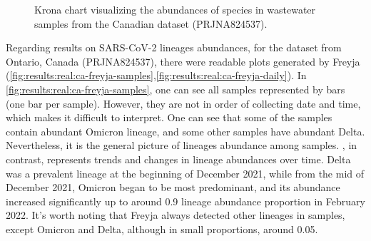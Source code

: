 \begin{figure}[ht!]
\begin{subfigure}[b]{0.3\textwidth}
        \label{fig:results:real:krona-ca-c}
        \end{subfigure}
        \caption{Krona chart visualizing the abundances of species in wastewater samples from the Canadian dataset (PRJNA824537).}
    \end{figure}
    
    Regarding results on SARS-CoV-2 lineages abundances, for the dataset from Ontario, Canada (PRJNA824537), there were readable plots generated by Freyja (\cref{fig:results:real:ca-freyja-samples},\ref{fig:results:real:ca-freyja-daily}). In \cref{fig:results:real:ca-freyja-samples}, one can see all samples represented by bars (one bar per sample). However, they are not in order of collecting date and time, which makes it difficult to interpret. One can see that some of the samples contain abundant Omicron lineage, and some other samples have abundant Delta. Nevertheless, it is the general picture of lineages abundance among samples. , in contrast, represents trends and changes in lineage abundances over time. Delta was a prevalent lineage at the beginning of December 2021, while from the mid of December 2021, Omicron began to be most predominant, and its abundance increased significantly up to around 0.9 lineage abundance proportion in February 2022. It's worth noting that Freyja always detected other lineages in samples, except Omicron and Delta, although in small proportions, around 0.05.
    
